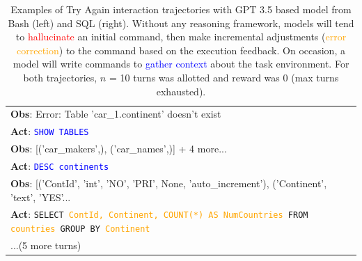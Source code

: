 \begin{table}[H]
\begin{minipage}[t]{.49\linewidth}
\begin{tabularx}{\textwidth}{X}
\textbf{Obs}: Error: Table 'car\_1.continent' doesn't exist \\
\textbf{Act}: \textcolor{blue}{\texttt{SHOW TABLES}} \\
\textbf{Obs}: [('car\_makers',), ('car\_names',)] + 4 more... \\
\textbf{Act}: \textcolor{blue}{\texttt{DESC continents}} \\
\textbf{Obs}: [('ContId', 'int', 'NO', 'PRI', None, 'auto\_increment'), ('Continent', 'text', 'YES'...
\\
\textbf{Act}: \texttt{SELECT \textcolor{orange}{ContId, Continent, COUNT(*) AS NumCountries} FROM \textcolor{orange}{countries} GROUP BY \textcolor{orange}{Continent}} \\
...(5 more turns) \\
\bottomrule
\end{tabularx}
\end{minipage}
\vspace{1em}
\caption{Examples of Try Again interaction trajectories with GPT 3.5 based model from Bash (left) and SQL (right). Without any reasoning framework, models will tend to \textcolor{red}{hallucinate} an initial command, then make incremental adjustments (\textcolor{orange}{error correction}) to the command based on the execution feedback. On occasion, a model will write commands to \textcolor{blue}{gather context} about the task environment. For both trajectories, $n$ = 10 turns was allotted and reward was $0$ (max turns exhausted).}
\label{table:expr-default-behavior}
\vspace{-1.5em}
\end{table}